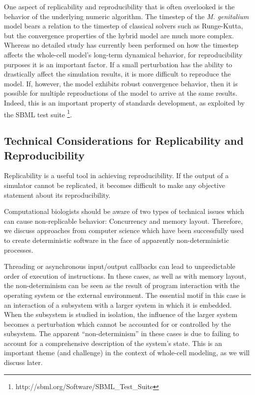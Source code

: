 \documentclass[journal,transmag,twoside]{IEEEtran}
\begin{document}
One aspect of replicability and reproducibility that is often overlooked is the
behavior of the underlying numeric algorithm.
The timestep of the \textit{M. genitalium} model bears a relation to the timestep
of classical solvers such as Runge-Kutta, but the convergence properties of the hybrid model
are much more complex.
Whereas no detailed study has currently been performed on how the timestep affects
the whole-cell model's long-term dynamical behavior, for reproducibility purposes it is
an important factor. If a small perturbation has the ability to drastically
affect the simulation results, it is more difficult to reproduce the model.
If, however, the model exhibits robust convergence behavior, then it is
possible for multiple reproductions of the model to arrive at the same results.
Indeed, this is an important property of standards development, as exploited by
the SBML test suite \footnote{http://sbml.org/Software/SBML\_Test\_Suite}.

\subsection{Technical Considerations for Replicability and Reproducibility}

Replicability is a useful tool in achieving reproducibility.
If the output of a simulator cannot be replicated, it becomes
difficult to make any objective statement about its reproducibility.

Computational biologists should be aware of two types of technical issues which 
can cause non-replicable behavior: Concurrency and memory layout.
Therefore, we discuss approaches from computer science which
have been successfully used to create deterministic software in the face of apparently
non-deterministic processes.

Threading or
asynchronous input/output callbacks can lead to unpredictable
order of execution of instructions.
In these cases, as well as with memory layout,
the non-determinism
can be seen as the result
of program interaction with the operating system or the external environment.
The essential motif in this case is an interaction of a subsystem
with a larger system in which it is embedded.
When the subsystem is studied in isolation, the influence of the larger
system becomes a perturbation which cannot be accounted for or controlled by
the subsystem. The apparent ``non-determinism'' in these cases
is due to failing to account for a comprehensive description of the system's state.
This is an important theme (and challenge) in the context of whole-cell modeling,
as we will discuss later. %
\end{document}
